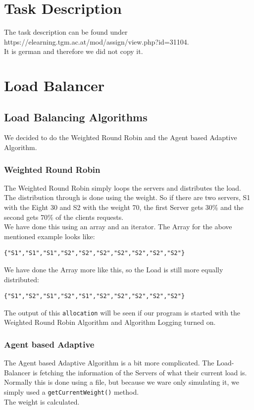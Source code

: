 \documentclass[12pt]{article}
\begin{document}
\section{Task Description}
The task description can be found under https://elearning.tgm.ac.at/mod/assign/view.php?id=31104. \\
It is german and therefore we did not copy it.
\section{Load Balancer}
\subsection{Load Balancing Algorithms}
We decided to do the Weighted Round Robin and the Agent based Adaptive Algorithm.
\subsubsection{Weighted Round Robin}
The Weighted Round Robin simply loops the servers and distributes the load. The distribution through is done using the weight. So if there are two servers, S1 with the Eight 30 and S2 with the weight 70, the first Server gets 30\% and the second gets 70\% of the clients requests. \\
We have done this using an array and an iterator.
The Array for the above mentioned example looks like:
\begin{lstlisting}    
{"S1","S1","S1","S2","S2","S2","S2","S2","S2","S2"}
\end{lstlisting}    
We have done the Array more like this, so the Load is still more equally distributed:
\begin{lstlisting}    
{"S1","S2","S1","S2","S1","S2","S2","S2","S2","S2"}
\end{lstlisting}    
The output of this \texttt{allocation} will be seen if our program is started with the Weighted Round Robin Algorithm and Algorithm Logging turned on.
\subsubsection{Agent based Adaptive}
The Agent based Adaptive Algorithm is a bit more complicated.
The Load-Balancer is fetching the information of the Servers of what their current load is.
Normally this is done using a file, but because we ware only simulating it, we simply used a \texttt{getCurrentWeight()} method. \\
The weight is calculated.
\end{document}
